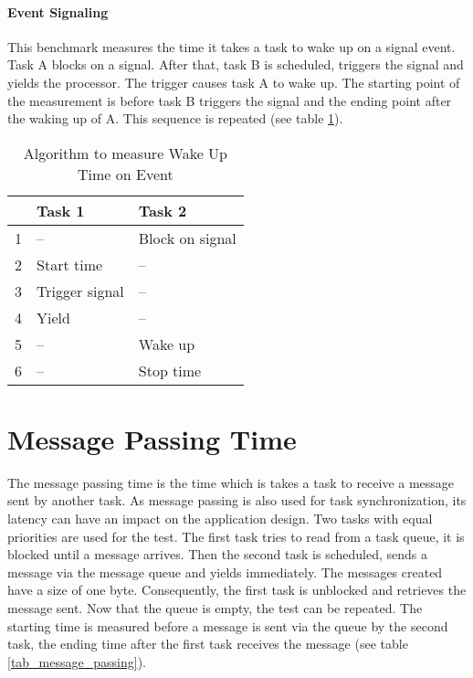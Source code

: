 \paragraph{Event Signaling}
This benchmark measures the time it takes a task to wake up on a signal event.
Task A blocks on a signal.
After that, task B is scheduled, triggers the signal and yields the processor. 
The trigger causes task A to wake up.
The starting point of the measurement is before task B triggers the signal and the ending point after the waking up of A.
This sequence is repeated (see table \ref{tab_binary_semaphore}).

\begin{table}[htbp]
	\centering
		\begin{tabular}{|l|l|l|}
			\hline
				& Task 1 							 	 & Task 2 										\\
				\hline 
				1 & --									   & Block on signal						\\
			  2 & Start time		 				 & --													\\
			  3 & Trigger signal				 & --													\\
			  4 & Yield								 	 & --													\\
			  5 & --									   & Wake up										\\
			  6 & --									 	 & Stop time									\\	  
			\hline
		\end{tabular}
	\caption{Algorithm to measure Wake Up Time on Event}
	\label{tab_binary_semaphore}
\end{table}

\section{Message Passing Time}
The message passing time is the time which is takes a task to receive a message sent by another task.
As message passing is also used for task synchronization, its latency can have an impact on the application design.
Two tasks with equal priorities are used for the test.
The first task tries to read from a task queue, it is blocked until a message arrives.
Then the second task is scheduled, sends a message via the message queue and yields immediately. 
The messages created have a size of one byte.
Consequently, the first task is unblocked and retrieves the message sent.
Now that the queue is empty, the test can be repeated.
The starting time is measured before a message is sent via the queue by the second task, the ending time after the first task receives the message (see table \ref{tab_message_passing}).

